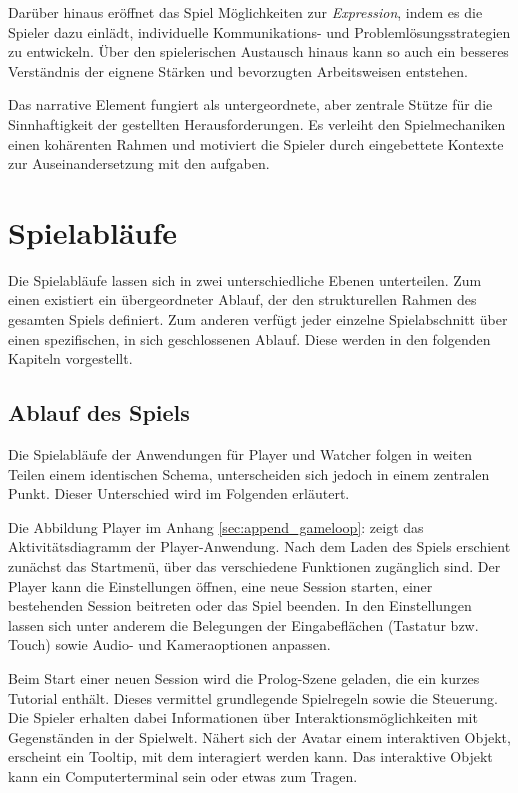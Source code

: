 Darüber hinaus eröffnet das Spiel Möglichkeiten zur \textit{Expression}, indem es die Spieler dazu einlädt, individuelle Kommunikations- und Problemlösungsstrategien zu entwickeln. Über den spielerischen Austausch hinaus kann so auch ein besseres Verständnis der eignene Stärken und bevorzugten Arbeitsweisen entstehen.

Das narrative Element fungiert als untergeordnete, aber zentrale Stütze für die Sinnhaftigkeit der gestellten Herausforderungen. Es verleiht den Spielmechaniken einen kohärenten Rahmen und motiviert die Spieler durch eingebettete Kontexte zur Auseinandersetzung mit den aufgaben.

\section{Spielabläufe}

Die Spielabläufe lassen sich in zwei unterschiedliche Ebenen unterteilen. Zum einen existiert ein übergeordneter Ablauf, der den strukturellen Rahmen des gesamten Spiels definiert. Zum anderen verfügt jeder einzelne Spielabschnitt über einen spezifischen, in sich geschlossenen Ablauf. Diese werden in den folgenden Kapiteln vorgestellt.

\subsection{Ablauf des Spiels}

Die Spielabläufe der Anwendungen für Player und Watcher folgen in weiten Teilen einem identischen Schema, unterscheiden sich jedoch in einem zentralen Punkt. Dieser Unterschied wird im Folgenden erläutert.

Die Abbildung Player im Anhang \ref{sec:append_gameloop}:  zeigt das Aktivitätsdiagramm der Player-Anwendung. Nach dem Laden des Spiels erschient zunächst das Startmenü, über das verschiedene Funktionen zugänglich sind. Der Player kann die Einstellungen öffnen, eine neue Session starten, einer bestehenden Session beitreten oder das Spiel beenden. In den Einstellungen lassen sich unter anderem die Belegungen der Eingabeflächen (Tastatur bzw. Touch) sowie Audio- und Kameraoptionen anpassen.

Beim Start einer neuen Session wird die Prolog-Szene geladen, die ein kurzes Tutorial enthält. Dieses vermittel grundlegende Spielregeln sowie die Steuerung. Die Spieler erhalten dabei Informationen über Interaktionsmöglichkeiten mit Gegenständen in der Spielwelt. Nähert sich der Avatar einem interaktiven Objekt, erscheint ein Tooltip, mit dem interagiert werden kann. Das interaktive Objekt kann ein Computerterminal sein oder etwas zum Tragen.

